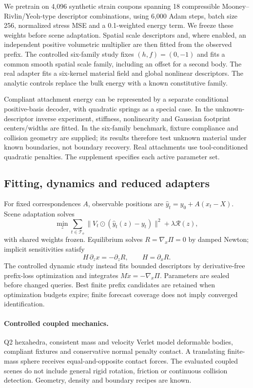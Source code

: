 \documentclass[10pt,twocolumn,letterpaper]{article}
\begin{document}
We pretrain on 4,096 synthetic strain coupons spanning 18 compressible Mooney--Rivlin/Yeoh-type descriptor combinations, using 6,000 Adam steps, batch size 256, normalized stress MSE and a 0.1-weighted energy term. We freeze these weights before scene adaptation. Spatial scale descriptors and, where enabled, an independent positive volumetric multiplier are then fitted from the observed prefix. The controlled six-family study fixes $(h,f)=(0,-1)$ and fits a common smooth spatial scale family, including an offset for a second body. The real adapter fits a six-kernel material field and global nonlinear descriptors. The analytic controls replace the bulk energy with a known constitutive family.

Compliant attachment energy can be represented by a separate conditional positive-basis decoder, with quadratic springs as a special case. In the unknown-descriptor inverse experiment, stiffness, nonlinearity and Gaussian footprint centers/widths are fitted. In the six-family benchmark, fixture compliance and collision geometry are supplied; its results therefore test unknown material under known boundaries, not boundary recovery. Real attachments use tool-conditioned quadratic penalties. The supplement specifies each active parameter set.

\subsection{Fitting, dynamics and reduced adapters}
For fixed correspondences $A$, observable positions are $\hat y_t=y_0+A(x_t-X)$. Scene adaptation solves
\begin{equation}\label{eq:fit}
\min_z\sum_{t\in\mathcal T_o}\|V_t\odot(\hat y_t(z)-y_t)\|^2+\lambda\mathcal R(z),
\end{equation}
with shared weights frozen. Equilibrium solves $R=\nabla_x\Pi=0$ by damped Newton; implicit sensitivities satisfy
\begin{equation}
H\,\partial_z x=-\partial_z R,\qquad H=\partial_xR.
\end{equation}
The controlled dynamic study instead fits bounded descriptors by derivative-free prefix-loss optimization and integrates $M\ddot x=-\nabla_x\Pi$. Parameters are sealed before changed queries. Best finite prefix candidates are retained when optimization budgets expire; finite forecast coverage does not imply converged identification.

\paragraph{Controlled coupled mechanics.}
Q2 hexahedra, consistent mass and velocity Verlet model deformable bodies, compliant fixtures and conservative normal penalty contact. A translating finite-mass sphere receives equal-and-opposite contact forces. The evaluated coupled scenes do not include general rigid rotation, friction or continuous collision detection. Geometry, density and boundary recipes are known.
\end{document}
